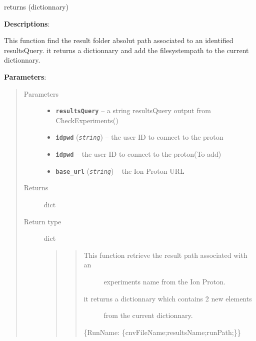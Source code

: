 \documentclass[letterpaper,10pt,english]{sphinxmanual}
\begin{document}
\begin{fulllineitems}
\label{datamanagerpkg:datamanagerpkg.ProtonCommunication_data_manager.QueryResults}
returns (dictionnary)

\textbf{Descriptions}:

This function find the result folder absolut path associated to an
identified resultsQuery. it returns a dictionnary 
and add the filesystempath to the current dictionnary.

\textbf{Parameters}:
\begin{quote}\begin{description}
\item[{Parameters}] \leavevmode\begin{itemize}
\item {} 
\textbf{\texttt{resultsQuery}} -- a string resultsQuery output from CheckExperiments()

\item {} 
\textbf{\texttt{idpwd}} (\emph{\texttt{string}}) -- the user ID to connect to the proton

\item {} 
\textbf{\texttt{idpwd}} -- the user ID to connect to the proton(To add)

\item {} 
\textbf{\texttt{base\_url}} (\emph{\texttt{string}}) -- the Ion Proton URL

\end{itemize}

\item[{Returns}] \leavevmode
dict

\item[{Return type}] \leavevmode

dict
\begin{quote}
\begin{quote}
\begin{description}
\item[{This function retrieve the result path associated with an}] \leavevmode
experiments name from the Ion Proton.

\item[{it returns a dictionnary which contains 2 new elements}] \leavevmode
from the current dictionnary.

\end{description}

\{RunName: \{cnvFileName;resultsName;runPath;\}\}
\end{quote}


\end{quote}
\end{description}
\end{quote}
\end{fulllineitems}
\end{document}
